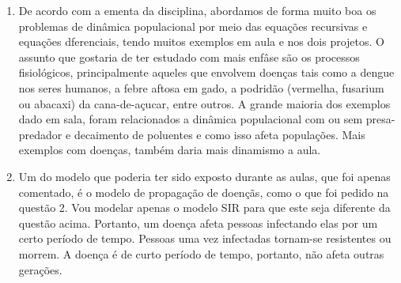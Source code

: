 \documentclass[a4paper]{article}
\begin{document}
\begin{enumerate}
\item
De acordo com a ementa da disciplina, abordamos de forma muito boa os problemas de din\^amica populacional por meio das equa\c{c}\~oes recursivas e equa\c{c}\~oes dferenciais, tendo muitos exemplos em aula e nos dois projetos. O assunto que gostaria de ter estudado com mais enfâse são os processos fisiol\'ogicos, principalmente aqueles que envolvem doen\c{c}as tais como a dengue nos seres humanos, a febre aftosa em gado, a podrid\~ao (vermelha, fusarium ou abacaxi) da cana-de-a\c{c}ucar, entre outros. A grande maioria dos exemplos dado em sala, foram relacionados a dinâmica populacional com ou sem presa-predador e decaimento de poluentes e como isso afeta popula\c{c}\~oes. Mais exemplos com doen\c{c}as, tamb\'em daria mais dinamismo a aula.
\\
\item
Um do modelo que poderia ter sido exposto durante as aulas, que foi apenas comentado, \'e o modelo de propaga\c{c}\~ao de doen\c{c}\~as, como o que foi pedido na quest\~ao 2. Vou modelar apenas o modelo SIR para que este seja diferente da quest\~ao acima. Portanto, um doen\c{c}a afeta pessoas infectando elas por um certo per\'iodo de tempo. Pessoas uma vez infectadas tornam-se resistentes ou morrem. A doen\c{c}a \'e de curto per\'iodo de tempo, portanto, n\~ao afeta outras gera\c{c}\~oes.
\\
\end{enumerate}
\end{document}

